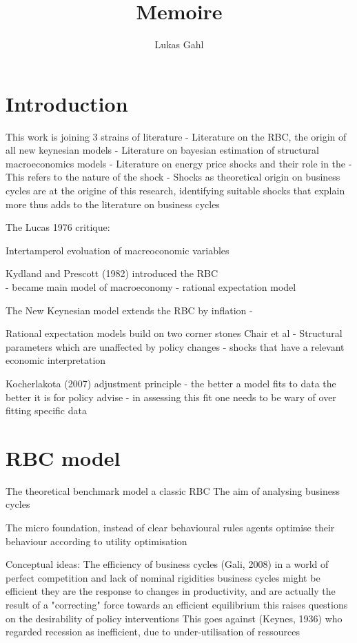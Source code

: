 \documentclass[11pt,a4paper,english]{article} %
\author{Lukas Gahl}
\title{\textbf{\huge Memoire }\\}
\date{}
\begin{document}
	
	\maketitle
	\pagebreak	
	
	\section{Introduction}
	
	This work is joining 3 strains of literature
	- Literature on the RBC, the origin of all new keynesian models
	- Literature on bayesian estimation of structural macroeconomics models
	- Literature on energy price shocks and their role in the 
		- This refers to the nature of the shock
		- Shocks as theoretical origin on business cycles are at the origine of this research, 
		identifying suitable shocks that explain more thus adds to the literature on business cycles
	
	The Lucas 1976 critique: 
	
	Intertamperol evoluation of macreoconomic variables
	
	Kydland and Prescott (1982) introduced the RBC \\
	- became main model of macroeconomy
	- rational expectation model
	
	The New Keynesian model extends the RBC by inflation
	- 
	
	Rational expectation models build on two corner stones Chair et al
	- Structural parameters which are unaffected by policy changes
	- shocks that have a relevant economic interpretation
	
	Kocherlakota (2007) adjustment principle
	- the better a model fits to data the better it is for policy advise
	- in assessing this fit one needs to be wary of over fitting specific data
	

	
	
	\section{RBC model}
	The theoretical benchmark model a classic RBC 
	The aim of analysing business cycles
	
	The micro foundation, instead of clear behavioural rules agents optimise their behaviour according to utility optimisation
	
	Conceptual ideas:
	The efficiency of business cycles (Gali, 2008)
	in a world of perfect competition and lack of nominal rigidities business cycles might be efficient
	they are the response to changes in productivity, and are actually the result of a "correcting" force towards an efficient equilibrium
	this raises questions on the desirability of policy interventions
	This goes against (Keynes, 1936) who regarded recession as inefficient, due to under-utilisation of ressources
	
\end{document}
